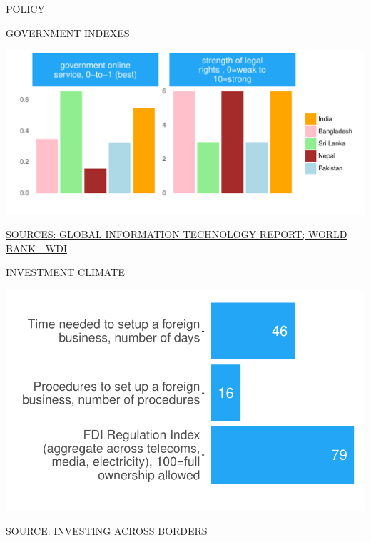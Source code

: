 \documentclass{article}\usepackage[]{graphicx}\usepackage[]{color}
\makeatletter
\def\maxwidth{ %
  \ifdim\Gin@nat@width>\linewidth
    \linewidth
  \else
    \Gin@nat@width
  \fi
}
\makeatother
\begin{document}
\begin{minipage}[c]{0.95\textwidth}
  \begin{flushleft}  
    \hspace{4ex}\Large{\textcolor[HTML]{22A6F5}{POLICY}}
  \end{flushleft}
  \begin{minipage}[c]{0.55\textwidth}
    \hspace{4ex}\small{\textcolor[HTML]{818181}{GOVERNMENT INDEXES}}
    \vspace{1ex}


\hfill{}\includegraphics[width=\maxwidth]{figure/bar_facewrap_chart_Policy-1} 



   \hspace{4ex}\scriptsize{\href{http://www3.weforum.org/docs/WEF_NRI_2012-2015_Historical_Dataset.xlsx}{\textcolor[HTML]{22A6F5}{SOURCES: GLOBAL INFORMATION TECHNOLOGY REPORT; }}\href{http://data.worldbank.org}{\textcolor[HTML]{22A6F5}{WORLD BANK - WDI}}}
  \end{minipage}
  \begin{minipage}[c]{0.43\textwidth}
    \small{\textcolor[HTML]{818181}{INVESTMENT CLIMATE}}
    \vspace{1ex}


{\centering \includegraphics[width=\maxwidth]{figure/bar_chart_Policy-1} 

}



    \vspace{-2ex}
    \scriptsize{\href{http://iab.worldbank.org/Data/ExploreTopics/Investing-across-sectors}{\textcolor[HTML]{22A6F5}{SOURCE: INVESTING ACROSS BORDERS}}}
  \end{minipage}
\end{minipage}
\end{document}

